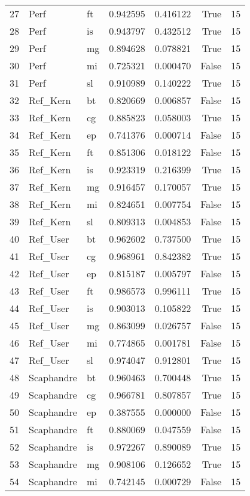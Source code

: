 \begin{tabular}{lllrrrr}
27 & Perf & ft & 0.942595 & 0.416122 & True & 15 \\
28 & Perf & is & 0.943797 & 0.432512 & True & 15 \\
29 & Perf & mg & 0.894628 & 0.078821 & True & 15 \\
30 & Perf & mi & 0.725321 & 0.000470 & False & 15 \\
31 & Perf & sl & 0.910989 & 0.140222 & True & 15 \\
32 & Ref_Kern & bt & 0.820669 & 0.006857 & False & 15 \\
33 & Ref_Kern & cg & 0.885823 & 0.058003 & True & 15 \\
34 & Ref_Kern & ep & 0.741376 & 0.000714 & False & 15 \\
35 & Ref_Kern & ft & 0.851306 & 0.018122 & False & 15 \\
36 & Ref_Kern & is & 0.923319 & 0.216399 & True & 15 \\
37 & Ref_Kern & mg & 0.916457 & 0.170057 & True & 15 \\
38 & Ref_Kern & mi & 0.824651 & 0.007754 & False & 15 \\
39 & Ref_Kern & sl & 0.809313 & 0.004853 & False & 15 \\
40 & Ref_User & bt & 0.962602 & 0.737500 & True & 15 \\
41 & Ref_User & cg & 0.968961 & 0.842382 & True & 15 \\
42 & Ref_User & ep & 0.815187 & 0.005797 & False & 15 \\
43 & Ref_User & ft & 0.986573 & 0.996111 & True & 15 \\
44 & Ref_User & is & 0.903013 & 0.105822 & True & 15 \\
45 & Ref_User & mg & 0.863099 & 0.026757 & False & 15 \\
46 & Ref_User & mi & 0.774865 & 0.001781 & False & 15 \\
47 & Ref_User & sl & 0.974047 & 0.912801 & True & 15 \\
48 & Scaphandre & bt & 0.960463 & 0.700448 & True & 15 \\
49 & Scaphandre & cg & 0.966781 & 0.807857 & True & 15 \\
50 & Scaphandre & ep & 0.387555 & 0.000000 & False & 15 \\
51 & Scaphandre & ft & 0.880069 & 0.047559 & False & 15 \\
52 & Scaphandre & is & 0.972267 & 0.890089 & True & 15 \\
53 & Scaphandre & mg & 0.908106 & 0.126652 & True & 15 \\
54 & Scaphandre & mi & 0.742145 & 0.000729 & False & 15 \\

\end{tabular}
